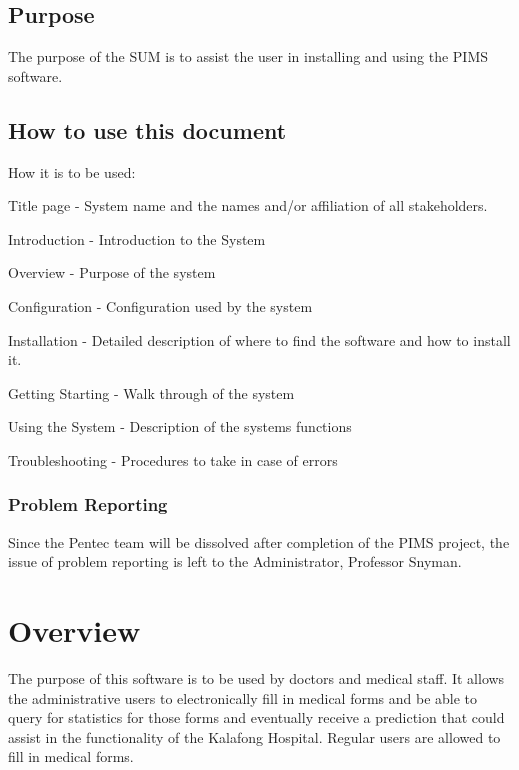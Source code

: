 \documentclass[14pt, a4paper]{article}
\begin{document}
\subsection{Purpose}
The purpose of the SUM is to assist the user in installing and using the PIMS software.\\

	
\subsection{How to use this document}
\begin{description}
\item How it is to be used:
\item[$\bullet$] Title page - System name and the names and/or affiliation of all stakeholders.
\item[$\bullet$] Introduction - Introduction to the System
\item[$\bullet$] Overview - Purpose of the system
\item[$\bullet$] Configuration - Configuration used by the system
\item[$\bullet$] Installation - Detailed description of where to find the software and how to install it.
\item[$\bullet$] Getting Starting - Walk through of the system
\item[$\bullet$] Using the System - Description of the systems functions
\item[$\bullet$] Troubleshooting - Procedures to take in case of errors
\end{description}

	
\subsubsection{Problem Reporting}
Since the Pentec team will be dissolved after completion of the PIMS project, the
issue of problem reporting is left to the Administrator, Professor Snyman.\\
	
	
\newpage

\section{Overview}
The purpose of this software is to be used by doctors and medical staff. It allows the administrative users to electronically fill in medical forms and be able to query for statistics for those forms and eventually receive a prediction that could assist in the functionality of the Kalafong Hospital. Regular users are allowed to fill in medical forms.
\\
\end{document}
